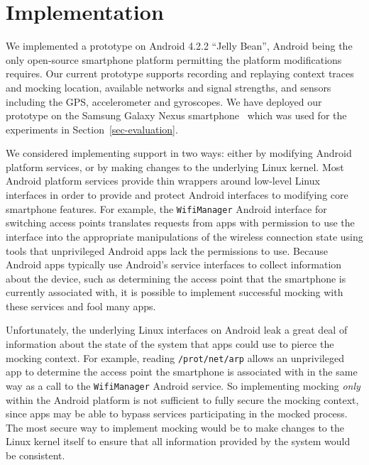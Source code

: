 \section{Implementation}
\label{sec-implementation}

We implemented a \PocketMocker{} prototype on Android 4.2.2 ``Jelly Bean'',
Android being the only open-source smartphone platform permitting the
platform modifications \PocketMocker{} requires. Our current prototype
supports recording and replaying context traces and mocking location,
available networks and signal strengths, and sensors including the GPS,
accelerometer and gyroscopes. We have deployed our prototype on the Samsung
Galaxy Nexus smartphone~\cite{galaxynexus} which was used for the experiments
in Section~\ref{sec-evaluation}.


We considered implementing \PocketMocker{} support in two ways: either by
modifying Android platform services, or by making changes to the underlying
Linux kernel. Most Android platform services provide thin wrappers around
low-level Linux interfaces in order to provide and protect Android interfaces
to modifying core smartphone features. For example, the \texttt{WifiManager}
Android interface for switching access points translates requests from apps
with permission to use the interface into the appropriate manipulations of
the wireless connection state using tools that unprivileged Android apps lack
the permissions to use. Because Android apps typically use Android's service
interfaces to collect information about the device, such as determining the
access point that the smartphone is currently associated with, it is possible
to implement successful mocking with these services and fool many apps.

Unfortunately, the underlying Linux interfaces on Android leak a great deal
of information about the state of the system that apps could use to pierce
the mocking context. For example, reading \texttt{/prot/net/arp} allows an
unprivileged app to determine the access point the smartphone is associated
with in the same way as a call to the \texttt{WifiManager} Android service.
So implementing mocking \textit{only} within the Android platform is not
sufficient to fully secure the mocking context, since apps may be able to
bypass services participating in the mocked process. The most secure way to
implement mocking would be to make changes to the Linux kernel itself to
ensure that all information provided by the system would be consistent.

